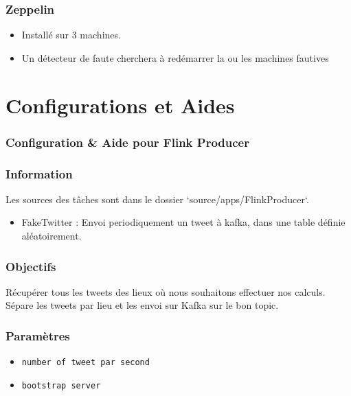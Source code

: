 \documentclass[a4paper,oneside,10pt]{article}
\begin{document}
\subsubsection{Zeppelin}

\begin{itemize}
\item Installé sur 3 machines. 
\item Un détecteur de faute cherchera à redémarrer la ou les machines fautives 
\end{itemize}

\section{Configurations et Aides}

\subsubsection{Configuration \& Aide pour Flink Producer}



\subsubsection{Information}

Les sources des tâches sont dans le dossier `source/apps/FlinkProducer`. 

\begin{itemize}
\item FakeTwitter : Envoi periodiquement un tweet à kafka, dans une table définie aléatoirement. 
\end{itemize} 


\subsubsection{Objectifs}

Récupérer tous les tweets des lieux où nous souhaitons effectuer nos calculs. Sépare les tweets par lieu et les envoi sur Kafka sur le bon topic. 


\subsubsection{Paramètres}

\begin{itemize}
\item \verb!number of tweet par second! 
\item \verb!bootstrap server!
\end{itemize}
\end{document}
